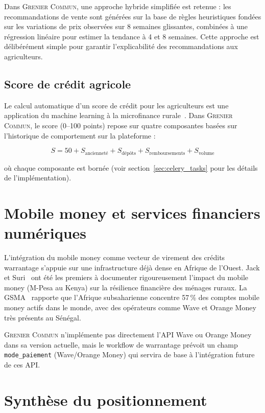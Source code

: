 \documentclass[12pt,a4paper,twoside]{report}
\newcommand{\gc}{\textsc{Grenier Commun}}
\begin{document}
Dans \gc{}, une approche hybride simplifiée est retenue : les recommandations
de vente sont générées sur la base de règles heuristiques fondées sur les
variations de prix observées sur 8 semaines glissantes, combinées à une
régression linéaire pour estimer la tendance à 4 et 8 semaines. Cette
approche est délibérément simple pour garantir l'explicabilité des recommandations
aux agriculteurs.

\subsection{Score de crédit agricole}

Le calcul automatique d'un score de crédit pour les agriculteurs est une
application du machine learning à la microfinance rurale~\cite{khandker2003impact}.
Dans \gc{}, le score (0--100 points) repose sur quatre composantes basées
sur l'historique de comportement sur la plateforme :

\begin{equation}
S = 50 + S_{\text{ancienneté}} + S_{\text{dépôts}} + S_{\text{remboursements}} + S_{\text{volume}}
\end{equation}

où chaque composante est bornée (voir section~\ref{sec:celery_tasks} pour
les détails de l'implémentation).

\section{Mobile money et services financiers numériques}

L'intégration du mobile money comme vecteur de virement des crédits warrantage
s'appuie sur une infrastructure déjà dense en Afrique de l'Ouest. Jack et
Suri~\cite{jack2011mobile} ont été les premiers à documenter rigoureusement
l'impact du mobile money (M-Pesa au Kenya) sur la résilience financière des
ménages ruraux. La GSMA~\cite{gsma2023mobileafrica} rapporte que l'Afrique
subsaharienne concentre 57\,\% des comptes mobile money actifs dans le monde,
avec des opérateurs comme Wave et Orange Money très présents au Sénégal.

\gc{} n'implémente pas directement l'API Wave ou Orange Money dans sa
version actuelle, mais le workflow de warrantage prévoit un champ
\texttt{mode\_paiement} (Wave/Orange Money) qui servira de base à
l'intégration future de ces API.

\section{Synthèse du positionnement}
\end{document}
